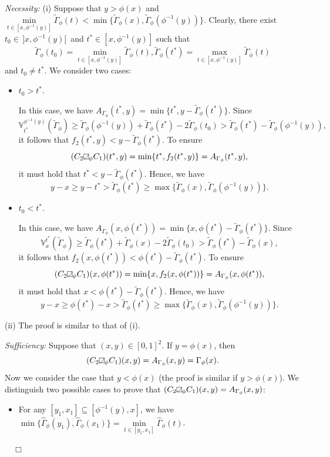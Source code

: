 \documentclass[12pt]{article}
\renewenvironment{proof}{\noindent{\bf Proof.}}{~~$\Box$}
\theoremstyle{plain}
\theoremstyle{definition}
\newcommand{\MySs}{
\begin{tikzpicture}[baseline]
\draw (0,0em) -- (0em,0.6em) -- (0.6em,0.6em) -- (0.6em,0em) -- (0,0em);
\draw (0,0em) parabola (0.6em, 0.6em);
\end{tikzpicture}}
\begin{document}
\begin{proof}
\emph{Necessity:} (i) Suppose that $y>\phi(x)$ and $\min\limits_{t\in [x, \phi^{-1}(y)]}\tilde{\Gamma}_\phi(t)<\min\{\tilde{\Gamma}_\phi(x), \tilde{\Gamma}_\phi(\phi^{-1}(y))\}$. Clearly, there exist
$t_0\in\,]x, \phi^{-1}(y)[\,$ and $t^*\in [x, \phi^{-1}(y)]$ such that
\[\tilde{\Gamma}_\phi(t_0)=\min\limits_{t\in[x, \phi^{-1}(y)]}\tilde{\Gamma}_\phi(t), \tilde{\Gamma}_\phi(t^*)=\max\limits_{t\in[x, \phi^{-1}(y)]}\tilde{\Gamma}_\phi(t)\]
and $t_0\neq t^*$. We consider two cases:
\begin{itemize}%
\item[\rm (a)] $t_0>t^*$.

 In this case, we have $A_{\Gamma_\phi}(t^*, y)=\min\{t^*, y-\tilde{\Gamma}_\phi(t^*)\}$. Since
 \[
 \mathbb{V}_{t^*}^{\phi^{-1}(y)}(\tilde{\Gamma}_\phi)\geq\tilde{\Gamma}_\phi(\phi^{-1}(y))+\tilde{\Gamma}_\phi(t^*)-2\tilde{\Gamma}_\phi(t_0)
 >\tilde{\Gamma}_\phi(t^*)-\tilde{\Gamma}_\phi(\phi^{-1}(y)),
 \]
 it follows that $f_2(t^*, y)<y-\tilde{\Gamma}_\phi(t^*)$. To ensure
 \[(C_2\MySs_\phi C_1)(t^*, y)=\min\{t^*, f_2(t^*, y)\}=A_{\Gamma_\phi}(t^*, y),\]
 it must hold that $t^*<y-\tilde{\Gamma}_\phi(t^*)$. Hence, we have
 \[y-x\geq y-t^*>\tilde{\Gamma}_\phi(t^*)\geq\max\{\tilde{\Gamma}_\phi(x), \tilde{\Gamma}_\phi(\phi^{-1}(y))\}.\]

 \item[\rm (b)] $t_0<t^*$.

 In this case, we have $A_{\Gamma_\phi}(x, \phi(t^*))=\min\{x, \phi(t^*)-\tilde{\Gamma}_\phi(t^*)\}$. Since
 \[
 \mathbb{V}_x^{t^*}(\tilde{\Gamma}_\phi)\geq\tilde{\Gamma}_\phi(t^*)+\tilde{\Gamma}_\phi(x)-2\tilde{\Gamma}_\phi(t_0)
 >\tilde{\Gamma}_\phi(t^*)-\tilde{\Gamma}_\phi(x),
 \]
 it follows that $f_2(x, \phi(t^*))<\phi(t^*)-\tilde{\Gamma}_\phi(t^*)$. To ensure
 \[(C_2\MySs_\phi C_1)(x, \phi(t^*))=\min\{x, f_2(x, \phi(t^*))\}=A_{\Gamma_\phi}(x, \phi(t^*)),\]
  it must hold that $x<\phi(t^*)-\tilde{\Gamma}_\phi(t^*)$. Hence, we have
  \[y-x\geq \phi(t^*)-x>\tilde{\Gamma}_\phi(t^*)\geq\max\{\tilde{\Gamma}_\phi(x), \tilde{\Gamma}_\phi(\phi^{-1}(y))\}.\]
\end{itemize}

(ii) The proof is similar to that of (i).

\emph{Sufficiency:} Suppose that $(x, y)\in [0, 1]^2$. If $y=\phi(x)$, then
\[(C_2\MySs_\phi C_1)(x, y)=A_{\Gamma_\phi}(x, y)=\Gamma_\phi(x).\]
Now we consider the case that $y<\phi(x)$ (the proof is similar if $y>\phi(x)$). We distinguish two possible cases to prove that $(C_2\MySs_\phi C_1)(x, y)=A_{\Gamma_\phi}(x, y)$:
\begin{itemize}%
\item[\rm (a)] For any $[y_1, x_1]\subseteq [\phi^{-1}(y), x]$, we have $\min\{\hat{\Gamma}_\phi(y_1), \hat{\Gamma}_\phi(x_1)\}=\min\limits_{t\in[y_1, x_1]}\hat{\Gamma}_\phi(t)$.


\end{itemize}
\end{proof}
\end{document}
